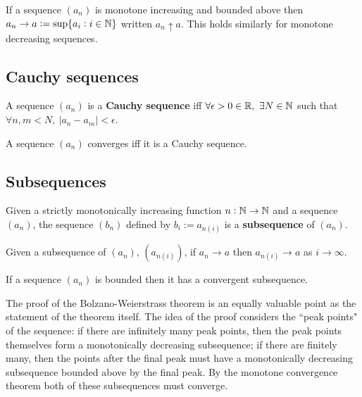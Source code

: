\begin{theorem}
    If a sequence $(a_n)$ is monotone increasing and bounded above then $a_n\rightarrow a := \sup\{a_i:i\in\mathbb{N}\}$ written $a_n\uparrow a$. This holds similarly for monotone decreasing sequences.
\end{theorem}

\subsection{Cauchy sequences}

\begin{definition}
   A sequence $(a_n)$ is a \textbf{Cauchy sequence} iff $\forall \epsilon>0\in\mathbb{R}, \ \exists N\in\mathbb{N}$ such that $\forall n,m<N, \ |a_n-a_m|<\epsilon$.
\end{definition}

\begin{theorem}
    A sequence $(a_n)$ converges iff it is a Cauchy sequence.
\end{theorem}

\subsection{Subsequences}

\begin{definition}[Subsequence]
    Given a strictly monotonically increasing function $n:\mathbb{N}\rightarrow\mathbb{N}$ and a sequence $(a_n)$, the  sequence $(b_n)$ defined by $b_i:=a_{n(i)}$ is a \textbf{subsequence} of $(a_n)$.
\end{definition}

\begin{theorem}
    Given a subsequence of $(a_n)$, $(a_{n(i)})$, if $a_n\rightarrow a$ then $a_{n(i)}\rightarrow a$ as $i\rightarrow\infty$.
\end{theorem}

\begin{theorem}
    If a sequence $(a_n)$ is bounded then it has a convergent subsequence.
\end{theorem}

\begin{note}
    The proof of the Bolzano-Weierstrass theorem is an equally valuable point as the statement of the theorem itself. The idea of the proof considers the ``peak points" of the sequence: if there are infinitely many peak points, then the peak points themselves form a monotonically decreasing subsequence; if there are finitely many, then the points after the final peak must have a monotonically decreasing subsequence bounded above by the final peak. By the monotone convergence theorem both of these subsequences must converge.
\end{note}

